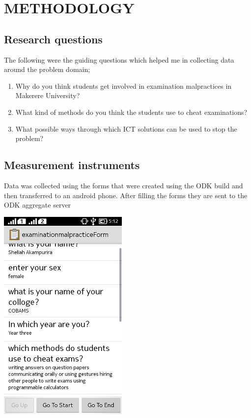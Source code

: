 \documentclass [8 pt]{article}
\begin{document}
\section { METHODOLOGY}
\subsection {Research questions}
 The following were the guiding questions which helped me in collecting data around the problem domain;
\begin {enumerate}
\item  Why do you think students get involved in examination malpractices in Makerere University?
\item What kind of methods do you think the students use to cheat examinations?
\item What possible ways through which ICT solutions can be used to stop the problem?


\end{enumerate}
\subsection {Measurement instruments}
Data was collected using the forms that were created using the ODK build and then transferred to an android phone. After filling the forms they are sent to the ODK aggregate server 

\includegraphics{pic1}
\end{document}
